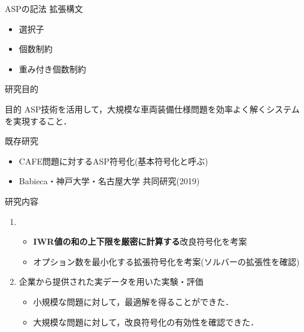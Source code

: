 \documentclass[dvipdfmx, 11pt]{beamer}
\begin{document}
\begin{frame}{ASPの記法}
 拡張構文
 \begin{itemize}
  \item 選択子
  \item 個数制約
  \item 重み付き個数制約
 \end{itemize}
\end{frame}
\begin{frame}{研究目的}
 \begin{alertblock}{目的}
  ASP技術を活用して，大規模な車両装備仕様問題を効率よく解くシステム
  を実現すること．
 \end{alertblock}
 \begin{block}{既存研究}
  \begin{itemize}
   \item CAFE問題に対するASP符号化(基本符号化と呼ぶ)
   \item Babieca・神戸大学・名古屋大学 共同研究(2019)
  \end{itemize}
 \end{block}
 \begin{block}{研究内容}
  \begin{enumerate}
   \item {}
	 \begin{itemize}
	  \item \alert{\bf IWR値の和の上下限を厳密に計算する}改良符号化を考案
	  \item オプション数を最小化する拡張符号化を考案(ソルバーの拡張性を確認)
	 \end{itemize}
   \item 企業から提供された実データを用いた実験・評価
	 \begin{itemize}
	  \item 小規模な問題に対して，最適解を得ることができた．
	  \item 大規模な問題に対して，改良符号化の有効性を確認できた．
	 \end{itemize}
  \end{enumerate}
 \end{block}
\end{frame}
\end{document}
